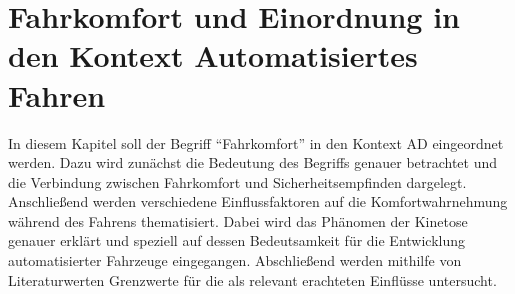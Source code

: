 \chapter{Fahrkomfort und Einordnung in den Kontext Automatisiertes Fahren}\label{cha:Komfort}
In diesem Kapitel soll der Begriff ``Fahrkomfort'' in den Kontext \gls{AD} eingeordnet werden. Dazu wird zunächst die Bedeutung des Begriffs genauer betrachtet und die Verbindung zwischen Fahrkomfort und Sicherheitsempfinden dargelegt. Anschließend werden verschiedene Einflussfaktoren auf die Komfortwahrnehmung während des Fahrens thematisiert. Dabei wird das Phänomen der Kinetose genauer erklärt und speziell auf dessen Bedeutsamkeit für die Entwicklung automatisierter Fahrzeuge eingegangen. Abschließend werden mithilfe von Literaturwerten Grenzwerte für die als relevant erachteten Einflüsse untersucht. 
